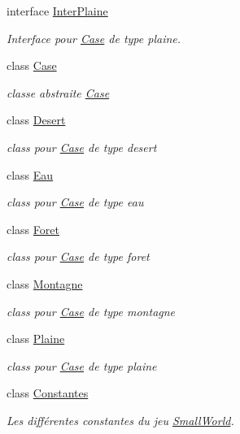 \begin{DoxyCompactItemize}
interface \hyperlink{interface_small_world_1_1_inter_plaine}{Inter\-Plaine}
\begin{DoxyCompactList}\small\item\em Interface pour \hyperlink{class_small_world_1_1_case}{Case} de type plaine. \end{DoxyCompactList}\item 
class \hyperlink{class_small_world_1_1_case}{Case}
\begin{DoxyCompactList}\small\item\em classe abstraite \hyperlink{class_small_world_1_1_case}{Case} \end{DoxyCompactList}\item 
class \hyperlink{class_small_world_1_1_desert}{Desert}
\begin{DoxyCompactList}\small\item\em class pour \hyperlink{class_small_world_1_1_case}{Case} de type desert \end{DoxyCompactList}\item 
class \hyperlink{class_small_world_1_1_eau}{Eau}
\begin{DoxyCompactList}\small\item\em class pour \hyperlink{class_small_world_1_1_case}{Case} de type eau \end{DoxyCompactList}\item 
class \hyperlink{class_small_world_1_1_foret}{Foret}
\begin{DoxyCompactList}\small\item\em class pour \hyperlink{class_small_world_1_1_case}{Case} de type foret \end{DoxyCompactList}\item 
class \hyperlink{class_small_world_1_1_montagne}{Montagne}
\begin{DoxyCompactList}\small\item\em class pour \hyperlink{class_small_world_1_1_case}{Case} de type montagne \end{DoxyCompactList}\item 
class \hyperlink{class_small_world_1_1_plaine}{Plaine}
\begin{DoxyCompactList}\small\item\em class pour \hyperlink{class_small_world_1_1_case}{Case} de type plaine \end{DoxyCompactList}\item 
class \hyperlink{class_small_world_1_1_constantes}{Constantes}
\begin{DoxyCompactList}\small\item\em Les différentes constantes du jeu \hyperlink{namespace_small_world}{Small\-World}. \end{DoxyCompactList}\item 

\end{DoxyCompactItemize}
